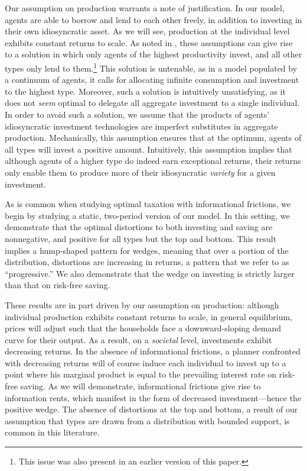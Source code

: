 \documentclass[11pt]{article}
\begin{document}
Our assumption on production warrants a note of justification. In our model, agents are able to borrow and lend to each other freely, in addition to investing in their own idiosyncratic asset. As we will see, production at the individual level exhibits constant returns to scale. As noted in \cite{shourideh2014optimal}, these assumptions can give rise to a solution in which only agents of the highest productivity invest, and all other types only lend to them.\footnote{This issue was also present in an earlier version of this paper.} This solution is untenable, as in a model populated by a continuum of agents, it calls for allocating infinite consumption and investment to the highest type. Moreover, such a solution is intuitively unsatisfying, as it does not \textit{seem} optimal to delegate all aggregate investment to a single individual. In order to avoid such a solution, we assume that the products of agents' idiosyncratic investment technologies are imperfect substitutes in aggregate production. Mechanically, this assumption ensures that at the optimum, agents of all types will invest a positive amount. Intuitively, this assumption implies that although agents of a higher type do indeed earn exceptional returns, their returns only enable them to produce more of their idiosyncratic \textit{variety} for a given investment. 

As is common when studying optimal taxation with informational frictions, we begin by studying a static, two-period version of our model. In this setting, we demonstrate that the optimal distortions to both investing and saving are nonnegative, and positive for all types but the top and bottom. This result implies a hump-shaped pattern for wedges, meaning that over a portion of the distribution, distortions are increasing in returns, a pattern that we refer to as ``progressive.'' We also demonstrate that the wedge on investing is strictly larger than that on risk-free saving.

These results are in part driven by our assumption on production: although individual production exhibits constant returns to scale, in general equilibrium, prices will adjust such that the households face a downward-sloping demand curve for their output. As a result, on a \textit{societal} level, investments exhibit decreasing returns. In the absence of informational frictions, a planner confronted with decreasing returns will of course induce each individual to invest up to a point where his marginal product is equal to the prevailing interest rate on risk-free saving. As we will demonstrate, informational frictions give rise to information rents, which manifest in the form of decreased investment---hence the positive wedge. The absence of distortions at the top and bottom, a result of our assumption that types are drawn from a distribution with bounded support, is common in this literature. 
\end{document}
